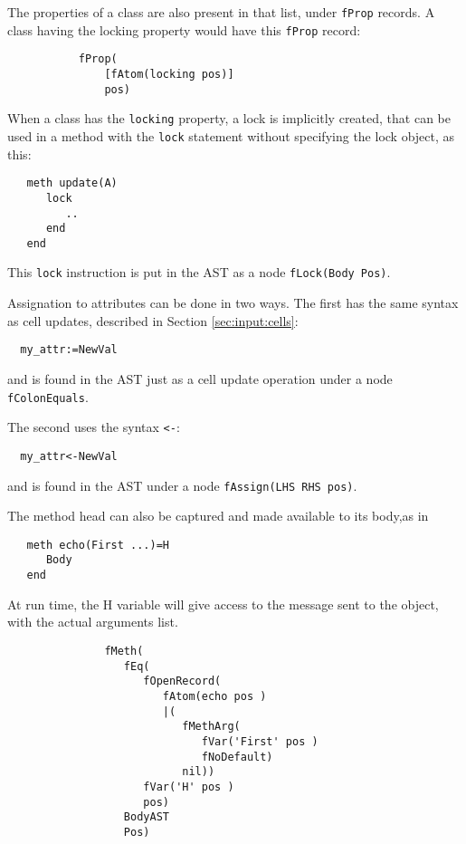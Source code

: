 \documentclass[a4paper]{memoir}
\begin{document}
The properties of a class are also present in that list, under \lstinline!fProp!
records. A class having the locking property would have this \lstinline!fProp! record:

\begin{lstlisting}
           fProp(
               [fAtom(locking pos)]
               pos)
\end{lstlisting}

When a class has the \lstinline!locking! property, a lock is implicitly created,
that can be used in a method with the \lstinline!lock! statement without
specifying the lock object, as this:

\begin{lstlisting}
   meth update(A)
      lock
         ..
      end
   end
\end{lstlisting}

This \lstinline!lock! instruction is put in the AST as a node
\lstinline!fLock(Body Pos)!. 

Assignation to attributes can be done in two ways. The first has the same syntax
as cell updates, described in Section \ref{sec:input:cells}:
\begin{lstlisting}
  my_attr:=NewVal
\end{lstlisting}
and is found in the AST just as a cell update operation under a node
\lstinline!fColonEquals!.

The second uses the syntax \lstinline!<-!:
\begin{lstlisting}
  my_attr<-NewVal
\end{lstlisting}
and is found in the AST under a node \lstinline!fAssign(LHS RHS pos)!.

\label{compilerinput:classes:headcapture}The method head can also be captured and made available to its body,as in 
\begin{lstlisting}
   meth echo(First ...)=H
      Body
   end  
\end{lstlisting}
At run time, the H variable will give access to the message sent to the object, with the actual arguments list.
\begin{lstlisting}
               fMeth(
                  fEq(
                     fOpenRecord(
                        fAtom(echo pos )
                        |(
                           fMethArg(
                              fVar('First' pos )
                              fNoDefault)
                           nil))
                     fVar('H' pos )
                     pos)
                  BodyAST
                  Pos)
\end{lstlisting}
\end{document}
